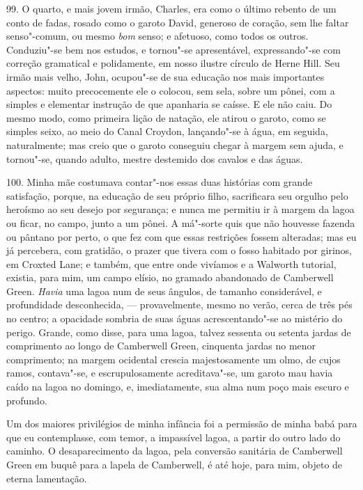 99. O quarto, e mais jovem irmão, Charles, era como o último rebento de
um conto de fadas, rosado como o garoto David, generoso de coração, sem
lhe faltar senso"-comum, ou mesmo \emph{bom} senso; e afetuoso, como
todos os outros. Conduziu"-se bem nos estudos, e tornou"-se apresentável,
expressando"-se com correção gramatical e polidamente, em nosso ilustre
círculo de Herne Hill. Seu irmão mais velho, John, ocupou"-se de sua
educação nos mais importantes aspectos: muito precocemente ele o
colocou, sem sela, sobre um pônei, com a simples e elementar instrução
de que apanharia se caísse. E ele não caiu. Do mesmo modo, como primeira
lição de natação, ele atirou o garoto, como se simples seixo, ao meio do
Canal Croydon, lançando"-se à água, em seguida, naturalmente; mas creio
que o garoto conseguiu chegar à margem sem ajuda, e tornou"-se, quando
adulto, mestre destemido dos cavalos e das águas.

100. Minha mãe costumava contar"-nos essas duas histórias com grande
satisfação, porque, na educação de seu próprio filho, sacrificara seu
orgulho pelo heroísmo ao seu desejo por segurança; e nunca me permitiu
ir à margem da lagoa ou ficar, no campo, junto a um pônei. A má"-sorte
quis que não houvesse fazenda ou pântano por perto, o que fez com que
essas restrições fossem alteradas; mas eu já percebera, com gratidão, o
prazer que tivera com o fosso habitado por girinos, em Croxted Lane; e
também, que entre onde vivíamos e a Walworth tutorial, existia, para
mim, um campo elísio, no gramado abandonado de Camberwell Green.
\emph{Havia} uma lagoa num de seus ângulos, de tamanho considerável, e
profundidade desconhecida, --- provavelmente, mesmo no verão, cerca de
três pés no centro; a opacidade sombria de suas águas acrescentando"-se
ao mistério do perigo. Grande, como disse, para uma lagoa, talvez
sessenta ou setenta jardas de comprimento ao longo de Camberwell Green,
cinquenta jardas no menor comprimento; na margem ocidental crescia
majestosamente um olmo, de cujos ramos, contava"-se, e escrupulosamente
acreditava"-se, um garoto mau havia caído na lagoa no domingo, e,
imediatamente, sua alma num poço mais escuro e profundo.

Um dos maiores privilégios de minha infância foi a permissão de minha
babá para que eu contemplasse, com temor, a impassível lagoa, a partir
do outro lado do caminho. O desaparecimento da lagoa, pela conversão
sanitária de Camberwell Green em buquê para a lapela de Camberwell, é
até hoje, para mim, objeto de eterna lamentação.


